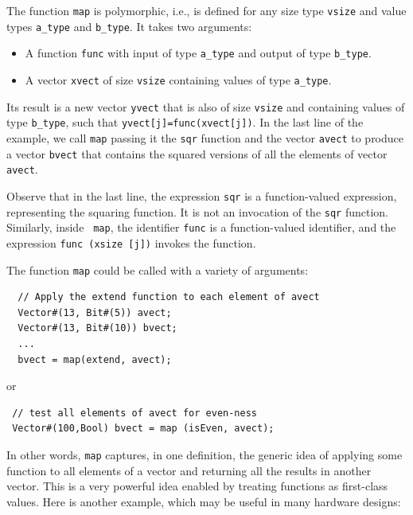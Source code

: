\documentclass[twoside,letterpaper]{article}
\begin{document}
The function \texttt{map} is polymorphic, i.e., is defined for any
size type \texttt{vsize} and value types \texttt{a\_type} and
\texttt{b\_type}.  It takes two arguments:

\begin{itemize}

\item A function \texttt{func} with input of type \texttt{a\_type} and
output of type \texttt{b\_type}.

\item A vector \texttt{xvect} of size \texttt{vsize} containing values
of type \texttt{a\_type}. 

\end{itemize}

Its result is a new vector \texttt{yvect} that is also of size
\texttt{vsize} and containing values of type \texttt{b\_type}, such
that \texttt{yvect[j]=func(xvect[j])}.  In the last line of the
example, we call \texttt{map} passing it the {\tt sqr} function and
the vector \texttt{avect} to produce a vector \texttt{bvect} that
contains the squared versions of all the elements of vector
\texttt{avect}.

Observe that in the last line, the expression \texttt{sqr} is a
function-valued expression, representing the squaring function.  It is
not an invocation of the \texttt{sqr} function.  Similarly, inside {\tt
map}, the identifier \texttt{func} is a function-valued identifier,
and the expression \texttt{func~(xsize~[j])} invokes the function.

The function \texttt{map} could be called with a variety of arguments:
\begin{verbatim}
  // Apply the extend function to each element of avect
  Vector#(13, Bit#(5)) avect;
  Vector#(13, Bit#(10)) bvect;
  ...
  bvect = map(extend, avect);
\end{verbatim}

or

\begin{verbatim}
 // test all elements of avect for even-ness
 Vector#(100,Bool) bvect = map (isEven, avect);
\end{verbatim}

In other words, \texttt{map} captures, in one definition, the generic
idea of applying some function to all elements of a vector and
returning all the results in another vector.  This is a very powerful
idea enabled by treating functions as first-class values.  Here is
another example, which may be useful in many hardware designs:
\end{document}
